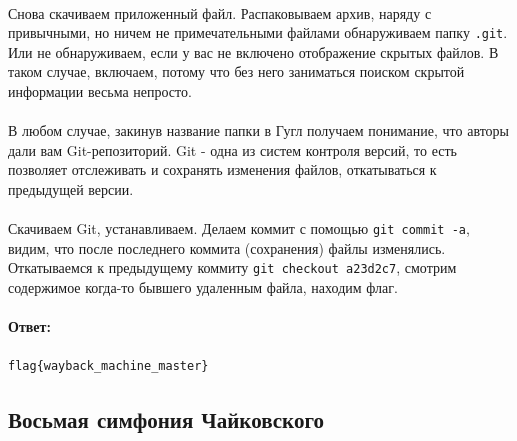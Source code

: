 \documentclass[12pt]{article}
\begin{document}
	\paragraph{}
    Снова скачиваем приложенный файл.
	Распаковываем архив, наряду с привычными, но ничем не примечательными файлами обнаруживаем папку \verb|.git|.
	Или не обнаруживаем, если у вас не включено отображение скрытых файлов.
	В таком случае, включаем, потому что без него заниматься поиском скрытой информации весьма непросто.
    \paragraph{}
	В любом случае, закинув название папки в Гугл получаем понимание, что авторы дали вам Git-репозиторий.
	Git - одна из систем контроля версий, то есть позволяет отслеживать и сохранять изменения файлов,
	откатываться к предыдущей версии.
    \paragraph{}
	Скачиваем Git, устанавливаем.
	Делаем коммит с помощью \verb|git commit -a|, видим, что после последнего коммита (сохранения) файлы изменялись.
	Откатываемся к предыдущему коммиту \verb|git checkout a23d2c7|,
    смотрим содержимое когда-то бывшего удаленным файла, находим флаг.
    \paragraph{Ответ:}
    \verb|flag{wayback_machine_master}|

    \subsection{Восьмая симфония Чайковского}
\end{document}
